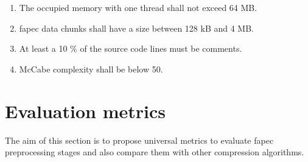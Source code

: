 \begin{enumerate}
	\item The occupied memory with one thread shall not exceed 64 MB.
	\item \acrshort{fapec} data chunks shall have a size between 128 kB and 4 MB.
	\item At least a 10 \% of the source code lines must be comments.
	\item McCabe complexity \parencite{mccabe} shall be below 50.
\end{enumerate}

\section{Evaluation metrics}
The aim of this section is to propose universal metrics to evaluate \acrshort{fapec} preprocessing stages and also compare them with other compression algorithms.

